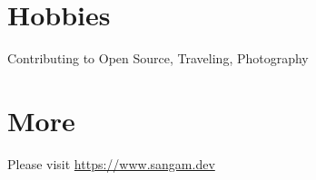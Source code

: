 \documentclass[margin, centered]{res}
\begin{document}
\begin{resume}
        \section{Hobbies}
            Contributing to Open Source, Traveling, Photography

        \section{More}
            Please visit \href{https://www.sangam.dev}{https://www.sangam.dev}

    \end{resume}
\end{document}
